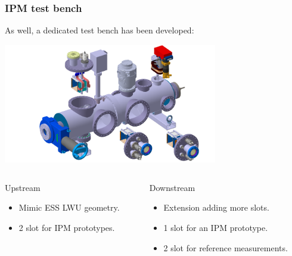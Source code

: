 \begin{frame}
  \frametitle{IPM test bench}
  As well, a dedicated test bench has been developed:
  \begin{center}
    \includegraphics[width=0.7\textwidth]{04_Test/fig/fig000_Testbench2.png}
  \end{center}
  \begin{columns}[T]
    \begin{column}{0.45\textwidth}
      \begin{block}{Upstream}
        \begin{itemize}
          \item Mimic ESS LWU geometry.
          \item 2 slot for IPM prototypes.
        \end{itemize}
      \end{block}
    \end{column}

    \begin{column}{0.45\textwidth}
      \begin{block}{Downstream}
        \begin{itemize}
          \item Extension adding more slots.
          \item 1 slot for an IPM prototype.
          \item 2 slot for reference measurements.
        \end{itemize}
      \end{block}
    \end{column}
  \end{columns}

\end{frame}

